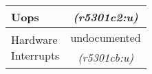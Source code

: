\begin{tabular}{|l||c|}
Uops                  &
{\em (r5301c2:u)}     \\ %


\hline
\multirow{3}{*}{\parbox{0.5in}{Hardware\\
Interrupts}}				&
\multirow{2}{*}{undocumented}          \\ %

			&
			\\ %

			&
{\em (r5301cb:u)}     \\ %


\hline

\end{tabular}
